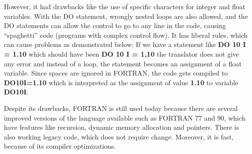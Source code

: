 \documentclass[twoside]{article}
\begin{document}
However, it had drawbacks like the use of specific characters for integer and float variables. With the DO statement, wrongly nested loops are also allowed, and the DO statements can allow the control to go to any line in the code, causing ``spaghetti'' code (programs with complex control flow). It has liberal rules, which can cause problems as demonstrated below:
If we have a statement like \textbf{DO 10 I = 1.10} which should have been \textbf{DO 10 I = 1,10} the translator does not give any error and instead of a loop, the statement becomes an assignment of a float variable. Since spaces are ignored in FORTRAN, the code gets compiled to \textbf{DO10I=1.10} which is interpreted as the assignment of value \textbf{1.10} to variable \textbf{DO10I}.\par 

Despite its drawbacks, FORTRAN is still used today because there are several improved versions of the language available such as FORTRAN 77 and 90, which have features like recursion, dynamic memory allocation and pointers. There is also working legacy code, which does not require change. Moreover, it is fast, because of its compiler optimizations.
\end{document}
